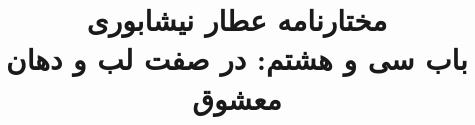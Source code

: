\documentclass[14pt,b5paper]{article}
\begin{document}
\title{\Huge مختارنامه عطار نیشابوری \\
باب سی و هشتم: در صفت لب و دهان معشوق}
\author{ }
\date{ }
\maketitle
\newpage
\tableofcontents
\newpage

\newpage

\newpage

\newpage

\newpage

\newpage

\newpage

\newpage

\newpage

\newpage

\newpage

\newpage

\newpage

\newpage

\newpage

\newpage

\newpage

\newpage

\newpage

\newpage

\newpage

\newpage

\newpage

\newpage

\newpage

\newpage

\newpage

\newpage

\newpage

\newpage

\newpage

\newpage

\newpage

\newpage

\newpage

\newpage
\end{document}
